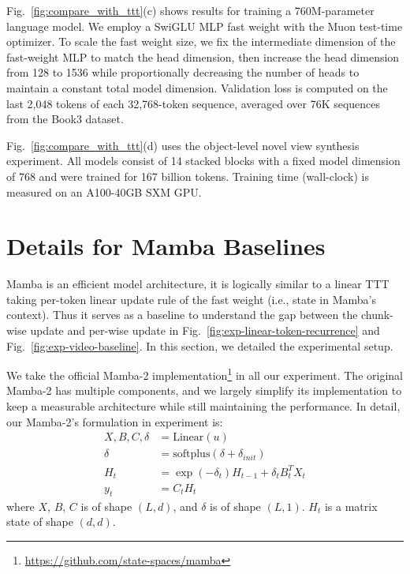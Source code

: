 Fig.~\ref{fig:compare_with_ttt}(c) shows results for training a 760M-parameter \methodname{} language model. We employ a SwiGLU MLP fast weight with the Muon test-time optimizer. To scale the fast weight size, we fix the intermediate dimension of the fast-weight MLP to match the head dimension, then increase the head dimension from 128 to 1536 while proportionally decreasing the number of heads to maintain a constant total model dimension. Validation loss is computed on the last 2,048 tokens of each 32,768-token sequence, averaged over 76K sequences from the Book3 dataset.

Fig.~\ref{fig:compare_with_ttt}(d) uses the object-level novel view synthesis experiment. All models consist of 14 stacked blocks with a fixed model dimension of 768 and were trained for 167 billion tokens. Training time (wall-clock) is measured on an A100-40GB SXM GPU.




\section{Details for Mamba Baselines}

Mamba is an efficient model architecture, it is logically similar to a linear TTT taking per-token linear update rule of the fast weight (i.e., state in Mamba's context).
Thus it serves as a baseline to understand the gap between the chunk-wise update and per-wise update in Fig.~\ref{fig:exp-linear-token-recurrence} and Fig.~\ref{fig:exp-video-baseline}.
In this section, we detailed the experimental setup.

We take the official Mamba-2 implementation\footnote{\hyperlink{https://github.com/state-spaces/mamba}{https://github.com/state-spaces/mamba}} in all our experiment. The original Mamba-2 has multiple components, and we largely simplify its implementation to keep a measurable architecture while still maintaining the performance.
In detail, our Mamba-2's formulation in experiment is:
\begin{align}
    X, B, C, \delta & = \mathrm{Linear}(u) \nonumber \\
    \delta & = \mathrm{softplus}(\delta + \delta_\mathit{init}) \nonumber \\
    H_t &= \exp(-\delta_t) H_{t-1} + \delta_t B_t^T X_t \nonumber \\
    y_t &= C_t H_t 
\end{align}
where $X$, $B$, $C$ is of shape $(L, d)$, and $\delta$ is of shape $(L, 1)$. $H_t$ is a matrix state of shape $(d, d)$.

